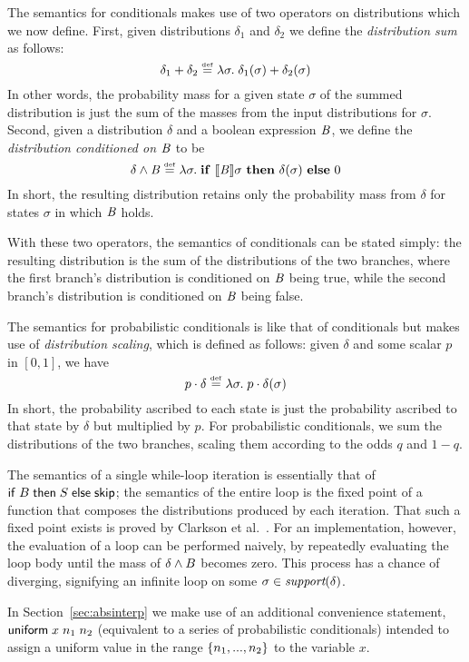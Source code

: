 The semantics for conditionals makes use of two operators on
distributions which we now define.  First, given distributions
$\delta_1$ and $\delta_2$ we define the \emph{distribution sum} as
follows:
$$ \delta_1 + \delta_2 \stackrel{\smash{\scriptscriptstyle \mathrm{def}}}= \lambda \sigma . \; \delta_1(\sigma) +
\delta_2(\sigma) $$
In other words, the probability mass for a given state
$\sigma$ of the summed distribution is just the sum of the masses from
the input distributions for $\sigma$.  Second, given a distribution
$\delta$ and a boolean expression $\mathit{B}$, we define the
\emph{distribution conditioned on $\mathit{B}$} to be
$$ \delta \wedge \mathit{B} \stackrel{\smash{\scriptscriptstyle \mathrm{def}}}= \lambda \sigma . \; \text{\textbf{if} } [\![{\mathit{B}}]\!]{\sigma} \text{ \textbf{then} }
\delta(\sigma) \text{ \textbf{else} } 0 $$
In short, the resulting distribution retains only the probability mass
from $\delta$ for states $\sigma$ in which $\mathit{B}$
holds.

With these two operators, the semantics of conditionals can be stated
simply: the resulting distribution is the sum of the distributions of
the two branches, where the first branch's distribution is conditioned
on $\mathit{B}$ being true, while the second branch's distribution is
conditioned on $\mathit{B}$ being false.

The semantics for probabilistic conditionals is like that of conditionals
but makes use of \emph{distribution scaling}, which is defined as
follows: given $\delta$ and some scalar $p$ in $[0,1]$, we have
$$ p \cdot \delta \stackrel{\smash{\scriptscriptstyle \mathrm{def}}}= \lambda \sigma . \; p \cdot \delta(\sigma) $$
In short, the probability ascribed to each state is just the
probability ascribed to that state by $\delta$ but multiplied by $p$.
For probabilistic conditionals, we sum the distributions of the two
branches, scaling them according to the odds $q$ and $1 - q$.

The semantics of a single while-loop iteration is essentially
that of $\mathsf{if}\;{B}\;\mathsf{then}\;{S}\;\mathsf{else}\;{\mathsf{skip}}$; the semantics of the entire loop is
the fixed point of a function that composes the distributions produced
by each iteration.  That such a fixed point exists is proved by
Clarkson et al.~\cite{clarkson09quantifying}. For an implementation,
however, the evaluation of a loop can be performed naively, by
repeatedly evaluating the loop body until the mass of $
\delta \wedge B $ becomes zero. This process has a chance of
diverging, signifying an infinite loop on some $ \sigma \in
\textit{support}(\delta) $.

In Section~\ref{sec:absinterp} we make use of an additional
convenience statement, $\mathsf{uniform}\;{x}\;{n_1}\;n_2$ (equivalent to a
series of probabilistic conditionals)
intended to assign a uniform value in the range $ \left\{ n_1, ..., n_2 \right\}
$ to the variable $ x $.

